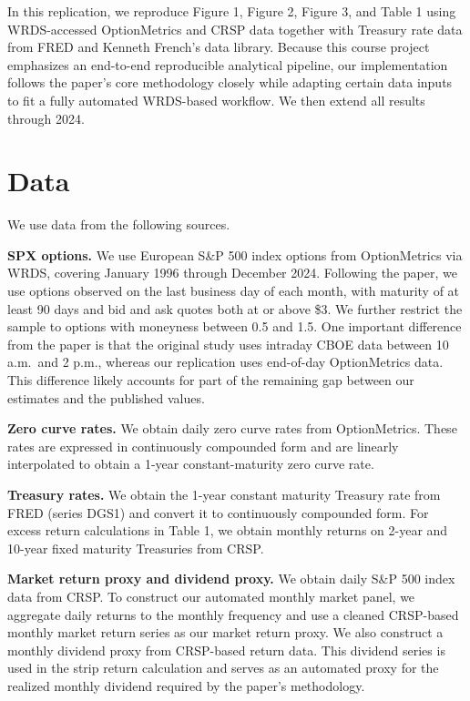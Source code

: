 \documentclass[12pt]{article}
\begin{document}
In this replication, we reproduce Figure 1, Figure 2, Figure 3, and Table 1
using WRDS-accessed OptionMetrics and CRSP data together with
Treasury rate data from FRED and Kenneth French's data library.
Because this course project emphasizes an end-to-end reproducible analytical pipeline,
our implementation follows the paper's core methodology closely
while adapting certain data inputs to fit a fully automated WRDS-based workflow.
We then extend all results through 2024.

\section{Data}

We use data from the following sources.

\textbf{SPX options.}
We use European S\&P 500 index options from OptionMetrics via WRDS,
covering January 1996 through December 2024.
Following the paper, we use options observed on the last business day of each month,
with maturity of at least 90 days and bid and ask quotes both at or above \$3.
We further restrict the sample to options with moneyness between 0.5 and 1.5.
One important difference from the paper is that the original study uses intraday CBOE data
between 10 a.m.\ and 2 p.m., whereas our replication uses end-of-day OptionMetrics data.
This difference likely accounts for part of the remaining gap between our estimates
and the published values.

\textbf{Zero curve rates.}
We obtain daily zero curve rates from OptionMetrics.
These rates are expressed in continuously compounded form and are linearly interpolated
to obtain a 1-year constant-maturity zero curve rate.

\textbf{Treasury rates.}
We obtain the 1-year constant maturity Treasury rate from FRED
(series DGS1) and convert it to continuously compounded form.
For excess return calculations in Table 1,
we obtain monthly returns on 2-year and 10-year fixed maturity Treasuries from CRSP.

\textbf{Market return proxy and dividend proxy.}
We obtain daily S\&P 500 index data from CRSP.
To construct our automated monthly market panel,
we aggregate daily returns to the monthly frequency and use a cleaned
CRSP-based monthly market return series as our market return proxy.
We also construct a monthly dividend proxy from CRSP-based return data.
This dividend series is used in the strip return calculation and serves
as an automated proxy for the realized monthly dividend required by the paper's methodology.
\end{document}
